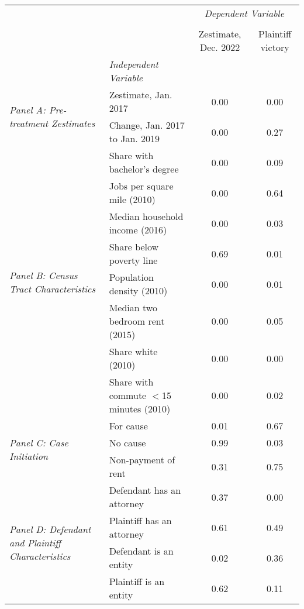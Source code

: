 \begin{tabular}{llcc}
\toprule
 &  & \multicolumn{2}{c}{\textit{Dependent Variable}} \\
\cline{3-4}
\\
 &  & Zestimate, Dec. 2022 & Plaintiff victory \\
 & \emph{Independent Variable} &  &  \\
\midrule
\multirow[c]{2}{3cm}{\textit{Panel A: Pre-treatment Zestimates}} & Zestimate, Jan. 2017 & 0.00 & 0.00 \\
 & Change, Jan. 2017 to Jan. 2019 & 0.00 & 0.27 \\
\cline{1-4}
\multirow[c]{8}{3cm}{\textit{Panel B: Census Tract Characteristics}} & Share with bachelor's degree & 0.00 & 0.09 \\
 & Jobs per square mile (2010) & 0.00 & 0.64 \\
 & Median household income (2016) & 0.00 & 0.03 \\
 & Share below poverty line & 0.69 & 0.01 \\
 & Population density (2010) & 0.00 & 0.01 \\
 & Median two bedroom rent (2015) & 0.00 & 0.05 \\
 & Share white (2010) & 0.00 & 0.00 \\
 & Share with commute $<$15 minutes (2010) & 0.00 & 0.02 \\
\cline{1-4}
\multirow[c]{3}{3cm}{\textit{Panel C: Case Initiation}} & For cause & 0.01 & 0.67 \\
 & No cause & 0.99 & 0.03 \\
 & Non-payment of rent & 0.31 & 0.75 \\
\cline{1-4}
\multirow[c]{4}{3cm}{\textit{Panel D: Defendant and Plaintiff Characteristics}} & Defendant has an attorney & 0.37 & 0.00 \\
 & Plaintiff has an attorney & 0.61 & 0.49 \\
 & Defendant is an entity & 0.02 & 0.36 \\
 & Plaintiff is an entity & 0.62 & 0.11 \\
\cline{1-4}
\bottomrule
\end{tabular}
